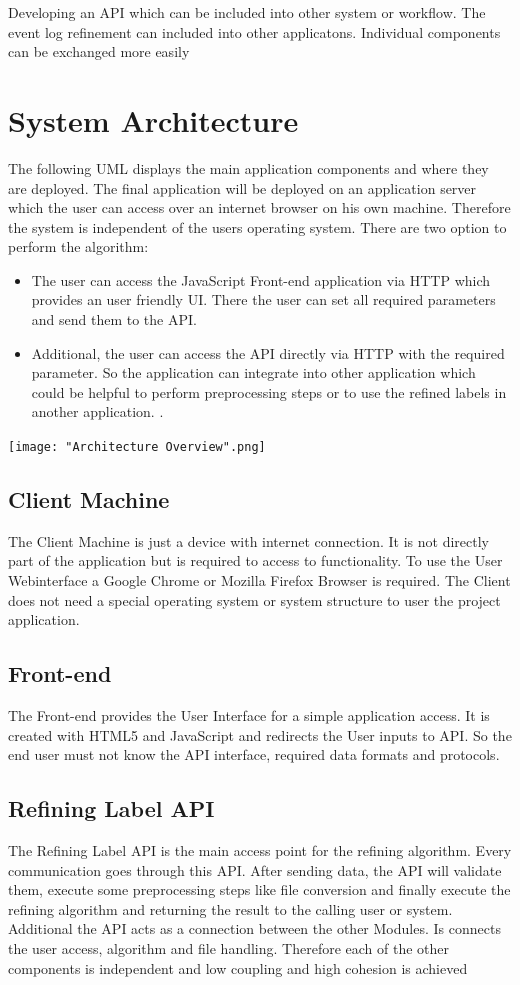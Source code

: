 \documentclass[notitlepage]{article}
\begin{document}
\begin{flushleft}
Developing an API which can be included into other system or workflow. The event log refinement can included into other applicatons. 
Individual components can be exchanged more easily 

\section{System Architecture}
The following UML displays the main application components and where they are deployed. The final application will be deployed on an application server which the user can access over an internet browser on his own machine. Therefore the system is independent of the users operating system. There are two option to perform the 
algorithm:

\begin{itemize}
	\item The user can access the JavaScript Front-end application via HTTP which provides an user friendly UI. There the user can set all required parameters and send them to the API.
	\item Additional, the user can access the API directly via HTTP with the required parameter. So the application can integrate into other application which could be helpful to perform preprocessing steps or to use the refined labels in another application. .
\end{itemize}




\texttt{[image: "Architecture Overview".png]}

\subsection{Client Machine}
The Client Machine is just a device with internet connection. It is not directly part of the application but is required to access to functionality.
To use the User Webinterface a Google Chrome or Mozilla Firefox Browser is required. The Client does not need a special operating system or system structure to user 
the project application.
\subsection{Front-end}
The Front-end provides the User Interface for a simple application access. It is created with HTML5 and JavaScript and redirects the User inputs to API.
So the end user must not know the API interface, required data formats and protocols.
\subsection{Refining Label API}
The Refining Label API is the main access point for the refining algorithm. Every communication goes through this API. After sending data, 
the API will validate them, execute some preprocessing steps like file conversion and finally execute the refining algorithm and returning the result to the calling user or system. 
Additional the API acts as a connection between the other Modules. Is connects the user access, algorithm and file handling.
Therefore each of the other components is independent and low coupling and high cohesion is achieved   

\end{flushleft}
\end{document}

